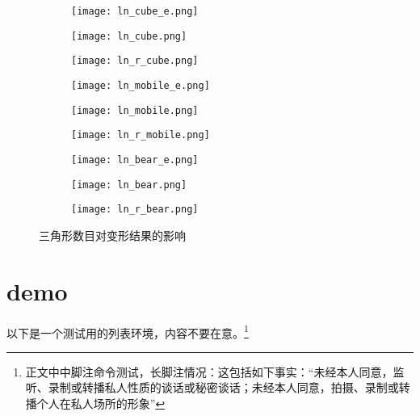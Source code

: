 \begin{figure}[htbp]
	\centering
	\begin{subfigure}[b]{.2\textwidth}
		\centering
		\texttt{[image: ln\_cube\_e.png]}
		\label{subfig:ln_cube_e}
	\end{subfigure}
	\begin{subfigure}[b]{.35\textwidth}
		\centering
		\texttt{[image: ln\_cube.png]}
		\label{subfig:ln_cube}
	\end{subfigure}
    \quad
	\begin{subfigure}[b]{.35\textwidth}
		\centering
		\texttt{[image: ln\_r\_cube.png]}
		\label{subfig:ln_r_cube}
	\end{subfigure}

	\begin{subfigure}[b]{.2\textwidth}
		\centering
		\texttt{[image: ln\_mobile\_e.png]}
		\label{subfig:ln_mobile_e}
	\end{subfigure}
    \quad
	\begin{subfigure}[b]{.35\textwidth}
		\centering
		\texttt{[image: ln\_mobile.png]}
		\label{subfig:ln_mobile}
	\end{subfigure}
    \quad
	\begin{subfigure}[b]{.35\textwidth}
		\centering
		\texttt{[image: ln\_r\_mobile.png]}
		\label{subfig:ln_r_mobile}
	\end{subfigure}

	\begin{subfigure}[b]{.2\textwidth}
		\centering
		\texttt{[image: ln\_bear\_e.png]}
		\label{subfig:ln_bear_e}
	\end{subfigure}
    \quad
	\begin{subfigure}[b]{.35\textwidth}
		\centering
		\texttt{[image: ln\_bear.png]}
		\label{subfig:ln_bear}
	\end{subfigure}
    \quad
	\begin{subfigure}[b]{.35\textwidth}
		\centering
		\texttt{[image: ln\_r\_bear.png]}
		\label{subfig:ln_r_bear}
	\end{subfigure}

	\caption{三角形数目对变形结果的影响}\label{fig:l}
\end{figure}



\section{demo}
以下是一个测试用的列表环境，内容不要在意。\footnote{正文中中脚注命令测试，长脚注情况：这包括如下事实：“未经本人同意，监听、录制或转播私人性质的谈话或秘密谈话；未经本人同意，拍摄、录制或转播个人在私人场所的形象”}

